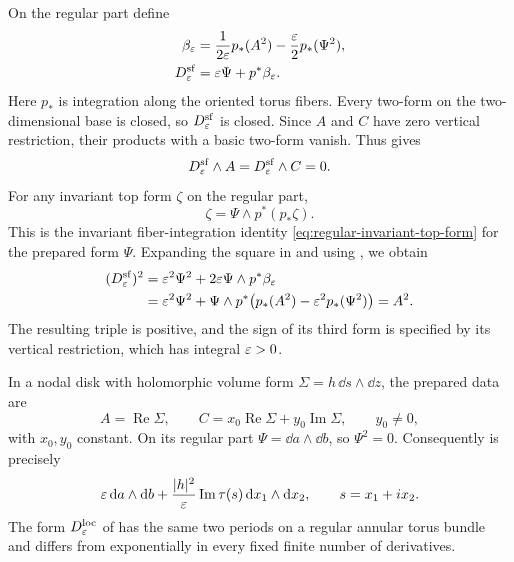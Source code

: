 On the regular part define
\begin{equation}
\begin{split}
  \beta_\varepsilon
    &=\frac{1}{2\varepsilon}p_*(A^2)
      -\frac{\varepsilon}{2}p_*(\Psi^2),\\
  D^{\mathrm{sf}}_\varepsilon&=\varepsilon\Psi+p^*\beta_\varepsilon.
\end{split}
\label{eq:auxiliary-semiflat}
\end{equation}
Here $p_*$ is integration along the oriented torus fibers.  Every
two-form on the two-dimensional base is closed, so
$D^{\mathrm{sf}}_\varepsilon$ is closed.  Since $A$ and $C$ have zero vertical
restriction, their products with a basic two-form vanish.  Thus
 gives
\[
  D^{\mathrm{sf}}_\varepsilon\wedge A
  =D^{\mathrm{sf}}_\varepsilon\wedge C=0.
\]
For any invariant top form $\zeta$ on the regular part,
\begin{equation}
  \zeta=\Psi\wedge p^*(p_*\zeta).
  \label{eq:auxiliary-fiber-integration}
\end{equation}
This is the invariant fiber-integration identity
\eqref{eq:regular-invariant-top-form} for the prepared form $\Psi$.
Expanding the square in  and using
, we obtain
\begin{equation}
\begin{split}
  (D^{\mathrm{sf}}_\varepsilon)^2
   &=\varepsilon^2\Psi^2+2\varepsilon\Psi\wedge p^*\beta_\varepsilon\\
   &=\varepsilon^2\Psi^2+
      \Psi\wedge p^*\bigl(p_*(A^2)-\varepsilon^2p_*(\Psi^2)\bigr)
     =A^2.
\end{split}
\label{eq:auxiliary-semiflat-square}
\end{equation}
The resulting triple is positive, and the sign of its third form is
specified by its vertical restriction, which has integral $\varepsilon>0$.

In a nodal disk with holomorphic volume form
$\Sigma=h\,\dd s\wedge\dd z$, the prepared data are
\[
  A=\operatorname{Re}\Sigma,\qquad
  C=x_0\operatorname{Re}\Sigma+y_0\operatorname{Im}\Sigma,
  \qquad y_0\ne0,
\]
with $x_0,y_0$ constant.  On its regular part
$\Psi=\dd a\wedge\dd b$, so $\Psi^2=0$.  Consequently
 is precisely
\begin{equation}
  \varepsilon\,\mathrm d a\wedge\mathrm d b
  +\frac{|h|^2}{\varepsilon}\operatorname{Im}\tau(s)\,
       \mathrm d x_1\wedge\mathrm d x_2,
  \qquad s=x_1+i x_2.
  \label{eq:auxiliary-model-semiflat}
\end{equation}
The form $D^{\mathrm{loc}}_\varepsilon$ of  has the same
two periods on a regular annular torus bundle and differs from
 exponentially in every fixed finite
number of derivatives.

